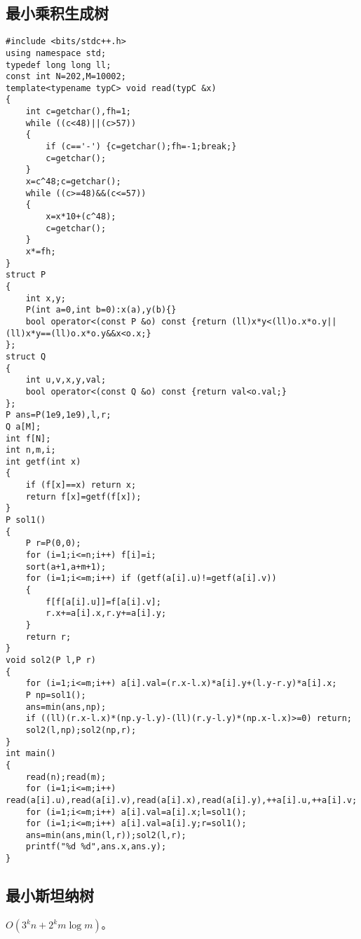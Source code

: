 \documentclass{ctexart}
\begin{document}
\subsection{最小乘积生成树}

\begin{lstlisting}
#include <bits/stdc++.h>
using namespace std;
typedef long long ll;
const int N=202,M=10002;
template<typename typC> void read(typC &x)
{
	int c=getchar(),fh=1;
	while ((c<48)||(c>57))
	{
		if (c=='-') {c=getchar();fh=-1;break;}
		c=getchar();
	}
	x=c^48;c=getchar();
	while ((c>=48)&&(c<=57))
	{
		x=x*10+(c^48);
		c=getchar();
	}
	x*=fh;
}
struct P
{
	int x,y;
	P(int a=0,int b=0):x(a),y(b){}
	bool operator<(const P &o) const {return (ll)x*y<(ll)o.x*o.y||(ll)x*y==(ll)o.x*o.y&&x<o.x;}
};
struct Q
{
	int u,v,x,y,val;
	bool operator<(const Q &o) const {return val<o.val;}
};
P ans=P(1e9,1e9),l,r;
Q a[M];
int f[N];
int n,m,i;
int getf(int x)
{
	if (f[x]==x) return x;
	return f[x]=getf(f[x]);
}
P sol1()
{
	P r=P(0,0);
	for (i=1;i<=n;i++) f[i]=i;
	sort(a+1,a+m+1);
	for (i=1;i<=m;i++) if (getf(a[i].u)!=getf(a[i].v))
	{
		f[f[a[i].u]]=f[a[i].v];
		r.x+=a[i].x,r.y+=a[i].y;
	}
	return r;
}
void sol2(P l,P r)
{
	for (i=1;i<=m;i++) a[i].val=(r.x-l.x)*a[i].y+(l.y-r.y)*a[i].x;
	P np=sol1();
	ans=min(ans,np);
	if ((ll)(r.x-l.x)*(np.y-l.y)-(ll)(r.y-l.y)*(np.x-l.x)>=0) return;
	sol2(l,np);sol2(np,r);
}
int main()
{
	read(n);read(m);
	for (i=1;i<=m;i++) read(a[i].u),read(a[i].v),read(a[i].x),read(a[i].y),++a[i].u,++a[i].v;
	for (i=1;i<=m;i++) a[i].val=a[i].x;l=sol1();
	for (i=1;i<=m;i++) a[i].val=a[i].y;r=sol1();
	ans=min(ans,min(l,r));sol2(l,r);
	printf("%d %d",ans.x,ans.y);
}
\end{lstlisting}

\subsection{最小斯坦纳树}

$O(3^kn+2^km\log m)$。
\end{document}
